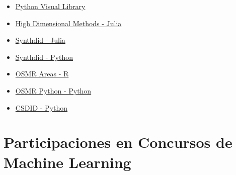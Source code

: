 \documentclass[11pt,a4paper,]{awesome-cv}
\providecommand{\tightlist}{%
	\setlength{\itemsep}{0pt}\setlength{\parskip}{0pt}}
\begin{document}
\begin{itemize}
\tightlist
\item
  \href{https://github.com/d2cml-ai/python_visual_library}{Python Visual
  Library}
\item
  \href{https://github.com/d2cml-ai/HDMjl.jl}{High Dimensional Methods -
  Julia}
\item
  \href{https://github.com/d2cml-ai/Synthdid.jl}{Synthdid - Julia}
\item
  \href{https://github.com/d2cml-ai/synthdid.py}{Synthdid - Python}
\item
  \href{https://github.com/d2cml-ai/osrmareas}{OSMR Areas - R}
\item
  \href{https://github.com/alexanderquispe/osrm_python}{OSMR Python -
  Python}
\item
  \href{https://github.com/d2cml-ai/csdid}{CSDID - Python} \normalsize
\end{itemize}

\hypertarget{participaciones-en-concursos-de-machine-learning}{%
\section{Participaciones en Concursos de Machine
Learning}\label{participaciones-en-concursos-de-machine-learning}}

\begin{cvhonors}
\end{cvhonors}
\end{document}
